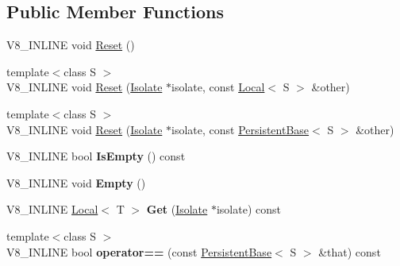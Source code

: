 \subsection*{Public Member Functions}
\begin{DoxyCompactItemize}
\item 
V8\+\_\+\+I\+N\+L\+I\+NE void \mbox{\hyperlink{classv8_1_1PersistentBase_a174bb1e45b18fd4eeaee033622825bb8}{Reset}} ()
\item 
{\footnotesize template$<$class S $>$ }\\V8\+\_\+\+I\+N\+L\+I\+NE void \mbox{\hyperlink{classv8_1_1PersistentBase_a11164f0dfc9a16d79809236e7a9670aa}{Reset}} (\mbox{\hyperlink{classv8_1_1Isolate}{Isolate}} $\ast$isolate, const \mbox{\hyperlink{classv8_1_1Local}{Local}}$<$ S $>$ \&other)
\item 
{\footnotesize template$<$class S $>$ }\\V8\+\_\+\+I\+N\+L\+I\+NE void \mbox{\hyperlink{classv8_1_1PersistentBase_af6b8f929b0cbaa83341df48ca3b03ef5}{Reset}} (\mbox{\hyperlink{classv8_1_1Isolate}{Isolate}} $\ast$isolate, const \mbox{\hyperlink{classv8_1_1PersistentBase}{Persistent\+Base}}$<$ S $>$ \&other)
\item 
\mbox{\label{classv8_1_1PersistentBase_aa4d270d1946260813a4fba08121fdbd1}} 
V8\+\_\+\+I\+N\+L\+I\+NE bool {\bfseries Is\+Empty} () const
\item 
\mbox{\label{classv8_1_1PersistentBase_abb8a06471ea86de1731a3c94a879b00e}} 
V8\+\_\+\+I\+N\+L\+I\+NE void {\bfseries Empty} ()
\item 
\mbox{\label{classv8_1_1PersistentBase_ae943e4070eb5d18493575b37a0cfb6f8}} 
V8\+\_\+\+I\+N\+L\+I\+NE \mbox{\hyperlink{classv8_1_1Local}{Local}}$<$ T $>$ {\bfseries Get} (\mbox{\hyperlink{classv8_1_1Isolate}{Isolate}} $\ast$isolate) const
\item 
\mbox{\label{classv8_1_1PersistentBase_a2a267a582638e2acc864f672b25e4b9c}} 
{\footnotesize template$<$class S $>$ }\\V8\+\_\+\+I\+N\+L\+I\+NE bool {\bfseries operator==} (const \mbox{\hyperlink{classv8_1_1PersistentBase}{Persistent\+Base}}$<$ S $>$ \&that) const
\item 
\mbox{\label{classv8_1_1PersistentBase_a4a2ec8bcbe0fe95cac2e3c17b800557e}} 

\end{DoxyCompactItemize}
